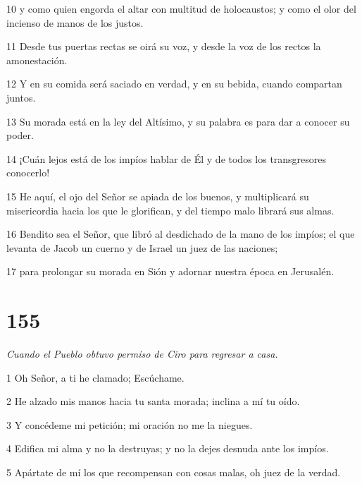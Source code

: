 \par 10 y como quien engorda el altar con multitud de holocaustos; y como el olor del incienso de manos de los justos.

\par 11 Desde tus puertas rectas se oirá su voz, y desde la voz de los rectos la amonestación.

\par 12 Y en su comida será saciado en verdad, y en su bebida, cuando compartan juntos.

\par 13 Su morada está en la ley del Altísimo, y su palabra es para dar a conocer su poder.

\par 14 ¡Cuán lejos está de los impíos hablar de Él y de todos los transgresores conocerlo!

\par 15 He aquí, el ojo del Señor se apiada de los buenos, y multiplicará su misericordia hacia los que le glorifican, y del tiempo malo librará sus almas.

\par 16 Bendito sea el Señor, que libró al desdichado de la mano de los impíos; el que levanta de Jacob un cuerno y de Israel un juez de las naciones;

\par 17 para prolongar su morada en Sión y adornar nuestra época en Jerusalén.

\chapter{155}

\par \textit{Cuando el Pueblo obtuvo permiso de Ciro para regresar a casa.}

\par 1 Oh Señor, a ti he clamado; Escúchame.

\par 2 He alzado mis manos hacia tu santa morada; inclina a mí tu oído.

\par 3 Y concédeme mi petición; mi oración no me la niegues.

\par 4 Edifica mi alma y no la destruyas; y no la dejes desnuda ante los impíos.

\par 5 Apártate de mí los que recompensan con cosas malas, oh juez de la verdad.

